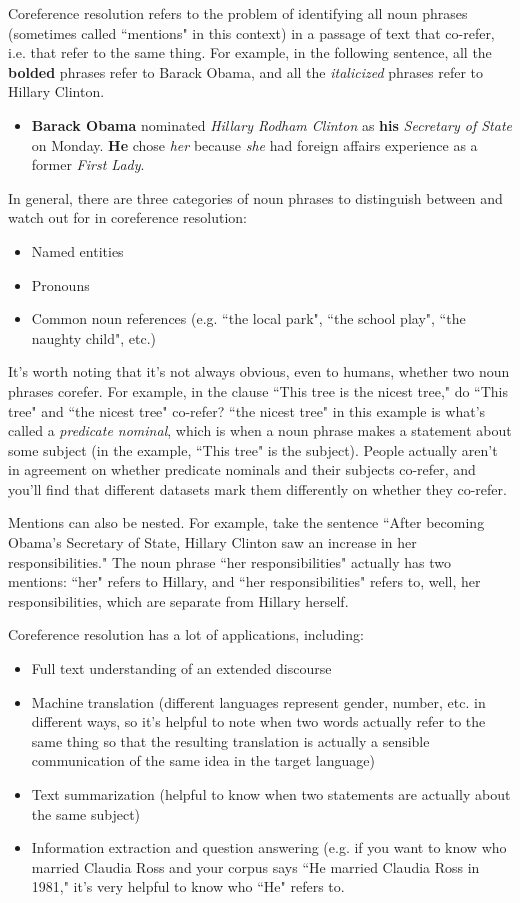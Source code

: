 Coreference resolution refers to the problem of identifying all noun phrases (sometimes called ``mentions" in this context) in a passage of text that co-refer, i.e. that refer to the same thing. For example, in the following sentence, all the \textbf{bolded} phrases refer to Barack Obama, and all the \emph{italicized} phrases refer to Hillary Clinton.
\begin{itemize}
\item \textbf{Barack Obama} nominated \emph{Hillary Rodham Clinton} as \textbf{his} \emph{Secretary of State} on Monday. \textbf{He} chose \emph{her} because \emph{she} had foreign affairs experience as a former \emph{First Lady}.
\end{itemize}
In general, there are three categories of noun phrases to distinguish between and watch out for in coreference resolution:
\begin{itemize}
\item Named entities
\item Pronouns
\item Common noun references (e.g. ``the local park", ``the school play", ``the naughty child", etc.)
\end{itemize}
It's worth noting that it's not always obvious, even to humans, whether two noun phrases corefer. For example, in the clause ``This tree is the nicest tree," do ``This tree" and ``the nicest tree" co-refer? ``the nicest tree" in this example is what's called a \emph{predicate nominal}, which is when a noun phrase makes a statement about some subject (in the example, ``This tree" is the subject). People actually aren't in agreement on whether predicate nominals and their subjects co-refer, and you'll find that different datasets mark them differently on whether they co-refer.

Mentions can also be nested. For example, take the sentence ``After becoming Obama's Secretary of State, Hillary Clinton saw an increase in her responsibilities." The noun phrase ``her responsibilities" actually has two mentions: ``her" refers to Hillary, and ``her responsibilities" refers to, well, her responsibilities, which are separate from Hillary herself.

Coreference resolution has a lot of applications, including:
\begin{itemize}
\item Full text understanding of an extended discourse
\item Machine translation (different languages represent gender, number, etc. in different ways, so it's helpful to note when two words actually refer to the same thing so that the resulting translation is actually a sensible communication of the same idea in the target language)
\item Text summarization (helpful to know when two statements are actually about the same subject)
\item Information extraction and question answering (e.g. if you want to know who married Claudia Ross and your corpus says ``He married Claudia Ross in 1981," it's very helpful to know who ``He" refers to.
\end{itemize}

